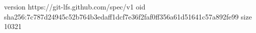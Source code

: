 version https://git-lfs.github.com/spec/v1
oid sha256:7c787d24945c52b764b3edaff1dcf7e36f2faf0ff356a61d51641c57a892fe99
size 10321
